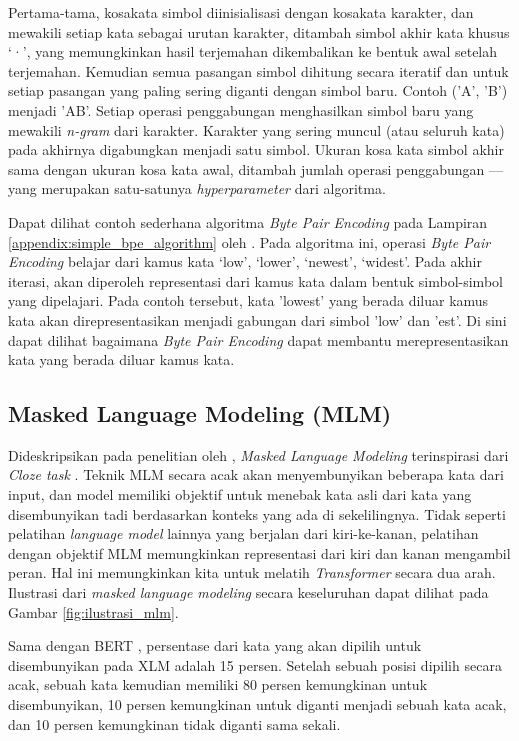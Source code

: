 \documentclass[conference]{IEEEtran}
\begin{document}
	Pertama-tama, kosakata simbol diinisialisasi dengan kosakata karakter, dan mewakili setiap kata sebagai urutan karakter, ditambah simbol akhir kata khusus ‘·’, yang memungkinkan hasil terjemahan dikembalikan ke bentuk awal setelah terjemahan. Kemudian semua pasangan simbol dihitung secara iteratif dan untuk setiap pasangan yang paling sering diganti dengan simbol baru. Contoh ('A', 'B') menjadi 'AB'. Setiap operasi penggabungan menghasilkan simbol baru yang mewakili \textit{n-gram} dari karakter. Karakter yang sering muncul (atau seluruh kata) pada akhirnya digabungkan menjadi satu simbol. Ukuran kosa kata simbol akhir sama dengan ukuran kosa kata awal, ditambah jumlah operasi penggabungan --- yang merupakan satu-satunya \textit{hyperparameter} dari algoritma.

	Dapat dilihat contoh sederhana algoritma \textit{Byte Pair Encoding} pada Lampiran \ref{appendix:simple_bpe_algorithm} oleh \cite{b16}. Pada algoritma ini, operasi \textit{Byte Pair Encoding} belajar dari kamus kata {‘low’, ‘lower’, ‘newest’, ‘widest’}. Pada akhir iterasi, akan diperoleh representasi dari kamus kata dalam bentuk simbol-simbol yang dipelajari. Pada contoh tersebut, kata 'lowest' yang berada diluar kamus kata akan direpresentasikan menjadi gabungan dari simbol 'low' dan 'est'. Di sini dapat dilihat bagaimana \textit{Byte Pair Encoding} dapat membantu merepresentasikan kata yang berada diluar kamus kata. 

	\subsection{Masked Language Modeling (MLM)}
	Dideskripsikan pada penelitian oleh \cite{b19}, \textit{Masked Language Modeling} terinspirasi dari \textit{Cloze task} \cite{b20}. Teknik MLM secara acak akan menyembunyikan beberapa kata dari input, dan model memiliki objektif untuk menebak kata asli dari kata yang disembunyikan tadi berdasarkan konteks yang ada di sekelilingnya. Tidak seperti pelatihan \textit{language model} lainnya yang berjalan dari kiri-ke-kanan, pelatihan dengan objektif MLM memungkinkan representasi dari kiri dan kanan mengambil peran. Hal ini memungkinkan kita untuk melatih \textit{Transformer} secara dua arah. Ilustrasi dari \textit{masked language modeling} secara keseluruhan dapat dilihat pada Gambar \ref{fig:ilustrasi_mlm}.
	
	Sama dengan BERT \cite{b19}, persentase dari kata yang akan dipilih untuk disembunyikan pada XLM adalah 15 persen. Setelah sebuah posisi dipilih secara acak, sebuah kata kemudian memiliki 80 persen kemungkinan untuk disembunyikan, 10 persen kemungkinan untuk diganti menjadi sebuah kata acak, dan 10 persen kemungkinan tidak diganti sama sekali.
\end{document}
